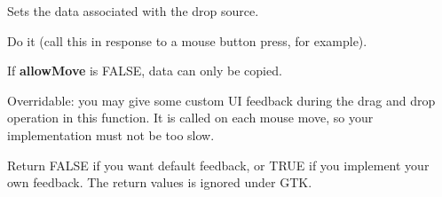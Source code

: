 Sets the data  associated with the drop source.

\label{wxdropsourcedodragdrop}


Do it (call this in response to a mouse button press, for example).

If {\bf allowMove} is FALSE, data can only be copied.

\label{wxdropsourcegivefeedback}


Overridable: you may give some custom UI feedback during the drag and drop operation
in this function. It is called on each mouse move, so your implementation must not be too
slow.





Return FALSE if you want default feedback, or TRUE if you implement your own
feedback. The return values is ignored under GTK.

